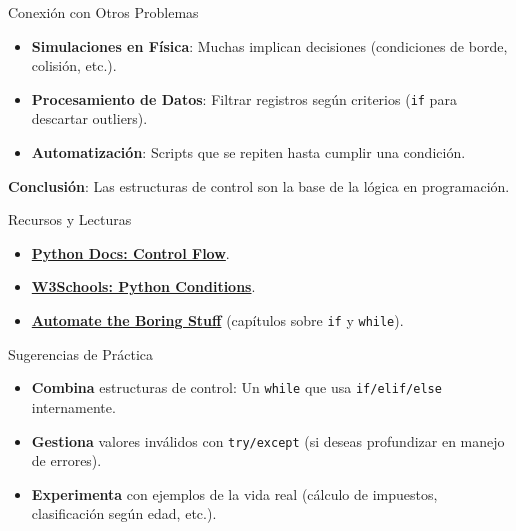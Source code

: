 \documentclass[10pt]{beamer}
\begin{document}
\begin{frame}{Conexión con Otros Problemas}
  \begin{itemize}
    \item \textbf{Simulaciones en Física}: Muchas implican decisiones (condiciones de borde, colisión, etc.).
    \item \textbf{Procesamiento de Datos}: Filtrar registros según criterios (\texttt{if} para descartar outliers).
    \item \textbf{Automatización}: Scripts que se repiten hasta cumplir una condición.
  \end{itemize}
  \textbf{Conclusión}: Las estructuras de control son la base de la lógica en programación.
\end{frame}

\begin{frame}{Recursos y Lecturas}
  \begin{itemize}
    \item \href{https://docs.python.org/3/tutorial/controlflow.html}{\textbf{Python Docs: Control Flow}}.
    \item \href{https://www.w3schools.com/python/python\_conditions.asp}{\textbf{W3Schools: Python Conditions}}.
    \item \href{https://automatetheboringstuff.com/}{\textbf{Automate the Boring Stuff}} (capítulos sobre \texttt{if} y \texttt{while}).
  \end{itemize}
\end{frame}

\begin{frame}{Sugerencias de Práctica}
  \begin{itemize}
    \item \textbf{Combina} estructuras de control: Un \texttt{while} que usa \texttt{if/elif/else} internamente.
    \item \textbf{Gestiona} valores inválidos con \texttt{try/except} (si deseas profundizar en manejo de errores).
    \item \textbf{Experimenta} con ejemplos de la vida real (cálculo de impuestos, clasificación según edad, etc.).
  \end{itemize}
\end{frame}
\end{document}
